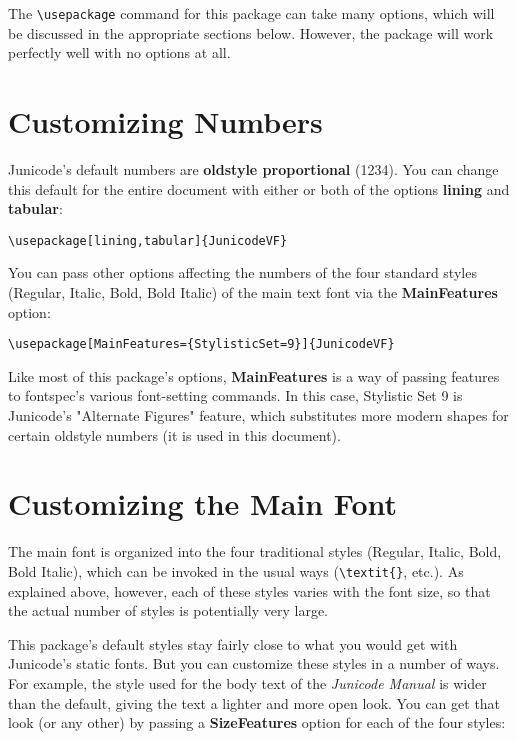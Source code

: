 \documentclass[12pt]{article}
\begin{document}
The {\small\verb|\usepackage|} command for this package can take many options,
which will be discussed in the appropriate sections below. However, the
package will work perfectly well with no options at all.

\section{Customizing Numbers}

Junicode's default numbers are \textbf{oldstyle proportional} (1234). You can change this
default for the entire document with either or both of the options \textbf{lining} and
\textbf{tabular}:

\begin{center}
    {\small\verb|\usepackage[lining,tabular]{JunicodeVF}|}
\end{center}

\noindent You can pass other options affecting the numbers of the four standard
styles (Regular, Italic, Bold, Bold Italic) of the main text font via the
\textbf{MainFeatures} option:

\begin{center}
    {\small\verb|\usepackage[MainFeatures={StylisticSet=9}]{JunicodeVF}|}
\end{center}

\noindent Like most of this package's options, \textbf{MainFeatures} is a way of passing
features to fontspec's various font-setting commands. In this case, Stylistic
Set 9 is Junicode's "Alternate Figures" feature, which substitutes more
modern shapes for certain oldstyle numbers (it is used in this document).

\section{Customizing the Main Font}

The main font is organized into the four traditional styles (Regular, Italic,
Bold, Bold Italic), which can be invoked in the usual ways
({\small\verb|\textit{}|}, etc.). As explained above, however, each of these
styles varies with the font size, so that the actual number of styles is
potentially very large.

This package's default styles stay fairly close to what you would get with
Junicode's static fonts. But you can customize these styles in a number of ways.
For example, the style used for the body text of the \textit{Junicode Manual}
is wider than the default, giving the text a lighter and more open look. You
can get that look (or any other) by passing a \textbf{SizeFeatures} option for 
each of the four styles:
\end{document}
